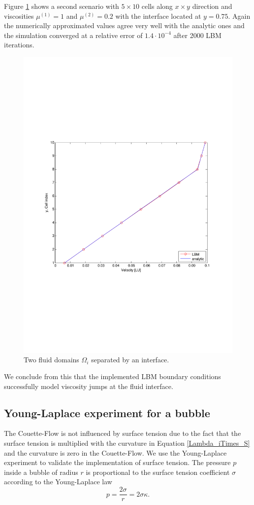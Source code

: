 \documentclass[final,leqno,onefignum,onetabnum]{siamltexmm}
\begin{document}
Figure \ref{couette2} shows a second scenario with $5 \times 10$ cells along $x \times y$ direction and viscosities $\mu^{(1)} = 1$ and $\mu^{(2)} = 0.2$ with the interface located at $y=0.75$. Again the numerically approximated values agree very well with the analytic ones and the simulation converged at a relative error of $1.4\cdot10^{-4}$ after 2000 LBM iterations.
\begin{figure}[h!]
	\flushright
	\includegraphics[trim = 0mm 8cm 0mm 8cm, clip, width=.7\textwidth, natwidth=595,natheight=842]{couette2.pdf}
	\caption{Two fluid domains $\Omega_i$ separated by an interface.}
	\label{couette2}
\end{figure}
We conclude from this that the implemented LBM boundary conditions successfully model viscosity jumps at the fluid interface.
\subsection{Young-Laplace experiment for a bubble}
The Couette-Flow is not influenced by surface tension due to the fact that the surface tension is multiplied with the curvature in Equation \ref{Lambda_iTimes_S} and the curvature is zero in the Couette-Flow. We use the Young-Laplace experiment to validate the implementation of surface tension. The pressure $p$ inside a bubble of radius $r$ is proportional to the surface tension coefficient $\sigma$ according to the Young-Laplace law
\begin{equation}
	p = \frac{2\sigma}{r} = 2 \sigma \kappa .
\end{equation}
\end{document}
